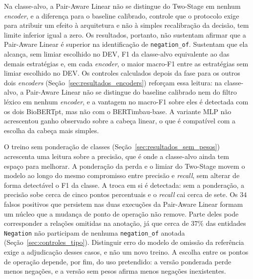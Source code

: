 Na classe-alvo, a Pair-Aware Linear não se distingue do Two-Stage em nenhum
\emph{encoder}, e a diferença para o baseline calibrado, controle que o protocolo
exige para atribuir um efeito à arquitetura e não à simples recalibração da decisão,
tem limite inferior igual a zero. Os resultados, portanto, não sustentam afirmar que
a Pair-Aware Linear é superior na identificação de \texttt{negation\_of}. Sustentam
que ela alcança, sem limiar escolhido no DEV, F1 da classe-alvo equivalente ao das
demais estratégias e, em cada \emph{encoder}, o maior macro-F1 entre as estratégias
sem limiar escolhido no DEV. Os controles calculados depois da fase para os outros
dois \emph{encoders} (Seção~\ref{sec:resultados_encoders}) reforçam essa leitura: na
classe-alvo, a Pair-Aware Linear não se distingue do baseline calibrado nem do filtro
léxico em nenhum \emph{encoder}, e a vantagem no macro-F1 sobre eles é detectada com
os dois BioBERTpt, mas não com o BERTimbau-base. A variante MLP não acrescentou ganho observado sobre a cabeça linear, o
que é compatível com a escolha da cabeça mais simples.

O treino sem ponderação de classes (Seção~\ref{sec:resultados_sem_pesos}) acrescenta
uma leitura sobre a precisão, que é onde a classe-alvo ainda tem espaço para
melhorar. A ponderação da perda e o limiar do Two-Stage movem o modelo ao longo do
mesmo compromisso entre precisão e \emph{recall}, sem alterar de forma detectável o
F1 da classe. A troca em si é detectada: sem a ponderação, a precisão sobe cerca de
cinco pontos percentuais e o \emph{recall} cai cerca de sete. Os $34$ falsos positivos que persistem nas duas execuções da
Pair-Aware Linear formam um núcleo que a mudança de ponto de operação não remove.
Parte deles pode corresponder a relações omitidas na anotação, já que cerca de
$37\%$ das entidades \texttt{Negation} não participam de nenhuma
\texttt{negation\_of} anotada (Seção~\ref{sec:controles_tipo}). Distinguir erro do
modelo de omissão da referência exige a adjudicação desses casos, e não um novo
treino. A escolha entre os pontos de operação depende, por fim, do uso
pretendido: a versão ponderada perde menos negações, e a versão sem pesos afirma
menos negações inexistentes.

